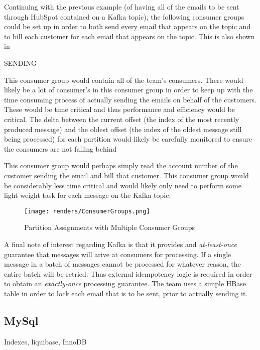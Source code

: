 Continuing with the previous example (of having all of the emails to be sent through HubSpot contained on a Kafka topic), the following consumer groups could be set up in order to both send every email that appears on the topic and to bill each customer for each email that appears on the topic. This is also shown in 
\begin{labeling}{SENDING}
\item[SENDING]{This consumer group would contain all of the \team{} team's consumers. There would likely be a lot of consumer's in this consumer group in order to keep up with the time consuming process of actually sending the emails on behalf of the customers. These would be time critical and thus performance and efficiency would be critical. The delta between the current offset (the index of the most recently produced message) and the oldest offset (the index of the oldest message still being processed) for each partition would likely be carefully monitored to ensure the consumers are not falling behind}
\item[BILLING]{This consumer group would perhaps simply read the account number of the customer sending the email and bill that customer. This consumer group would be considerably less time critical and would likely only need to perform some light weight task for each message on the Kafka topic.}
\end{labeling}


\begin{figure}[H]
      \centering
      \texttt{[image: renders/ConsumerGroups.png]}
      \caption{Partition Assignments with Multiple Consumer Groups}
      \label{fig:consumerGroups}
\end{figure}  

A final note of interest regarding Kafka is that it provides and \textit{at-least-once} guarantee that messages will arive at consumers for processing. If a single message in a batch of messages cannot be processed for whatever reason, the entire batch will be retried. Thus external idempotency logic is required in order to obtain an \textit{exactly-once} processing guarantee. The \team{} team uses a simple HBase table in order to lock each email that is to be sent, prior to actually sending it. 

\subsection{MySql}
Indexes, liquibase, InnoDB

